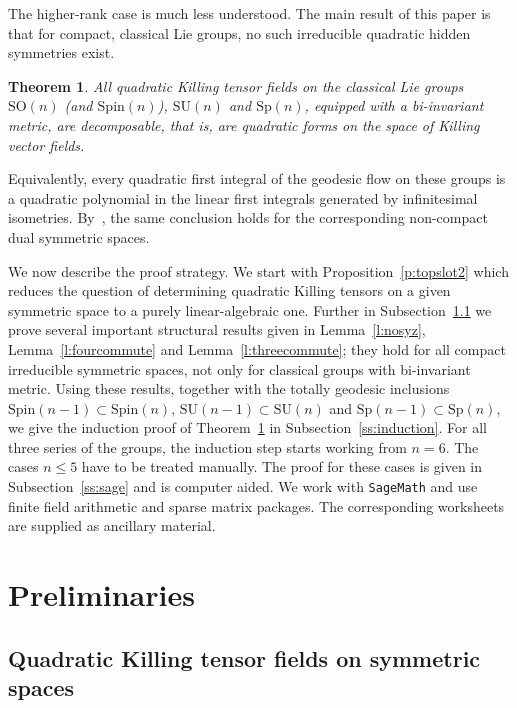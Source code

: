 \documentclass[12pt,reqno]{amsart}
\newcommand \SO{\mathrm{SO}}
\newcommand \Sp{\mathrm{Sp}}
\newcommand \SU{\mathrm{SU}}
\newcommand \Spin{\mathrm{Spin}}
\newcommand \<{\langle}
\renewcommand \>{\rangle}
\newtheorem{theorem}{Theorem}
\theoremstyle{definition}
\theoremstyle{remark}
\begin{document}
The higher-rank case is much less understood. The main result of this paper is that for compact, classical Lie groups, no such irreducible quadratic hidden symmetries exist.
	\begin{theorem} \label{t:SOSUSp}
		All quadratic Killing tensor fields on the classical Lie groups $\SO(n)$ \emph{(}and $\Spin(n)$\emph{)}, $\SU(n)$ and $\Sp(n)$, equipped with a bi-invariant metric, are decomposable, that is, are quadratic forms on the space of Killing vector fields.
	\end{theorem}
	
	Equivalently, every quadratic first integral of the geodesic flow on these groups is a quadratic polynomial in the linear first integrals generated by infinitesimal isometries. By~\cite[Theorem~2]{MN2}, the same conclusion holds for the corresponding non-compact dual symmetric spaces. 
	
We now describe the proof strategy. We start with Proposition~\ref{p:topslot2} which reduces the question of determining quadratic Killing tensors on a given symmetric space to a purely linear-algebraic one. Further in Subsection~\ref{ss:topslot} we prove several important structural results given in Lemma~\ref{l:nosyz}, Lemma~\ref{l:fourcommute} and Lemma~\ref{l:threecommute}; they hold for all compact irreducible symmetric spaces, not only for classical groups with bi-invariant metric. Using these results, together with the totally geodesic inclusions $\Spin(n-1)\subset\Spin(n), \, \SU(n-1)\subset\SU(n)$ and $\Sp(n-1)\subset\Sp(n)$, we give the induction proof of Theorem~\ref{t:SOSUSp} in Subsection~\ref{ss:induction}. For all three series of the groups, the induction step starts working from $n=6$. The cases $n \le 5$ have to be treated manually. The proof for these cases is given in Subsection~\ref{ss:sage} and is computer aided. We work with \texttt{SageMath} and use finite field arithmetic and sparse matrix packages. The corresponding worksheets are supplied as ancillary material.
	
	
	\section{Preliminaries}
	\label{s:prel}
	
	\subsection{Quadratic Killing tensor fields on symmetric spaces}
	\label{ss:topslot}
	
\end{document}
